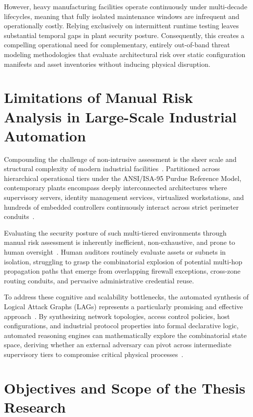 \documentclass[target=mst,aauheader=aics,style=]{thud}
\begin{document}
However, heavy manufacturing facilities operate continuously under multi-decade lifecycles, meaning that fully isolated maintenance windows are infrequent and operationally costly. Relying exclusively on intermittent runtime testing leaves substantial temporal gaps in plant security posture. Consequently, this creates a compelling operational need for complementary, entirely out-of-band threat modeling methodologies that evaluate architectural risk over static configuration manifests and asset inventories without inducing physical disruption.

\section{Limitations of Manual Risk Analysis in Large-Scale Industrial Automation}

Compounding the challenge of non-intrusive assessment is the sheer scale and structural complexity of modern industrial facilities~\cite{Sunder2024}. Partitioned across hierarchical operational tiers under the ANSI/ISA-95 Purdue Reference Model, contemporary plants encompass deeply interconnected architectures where supervisory servers, identity management services, virtualized workstations, and hundreds of embedded controllers continuously interact across strict perimeter conduits~\cite{Ou05, Stan2023}. 

Evaluating the security posture of such multi-tiered environments through manual risk assessment is inherently inefficient, non-exhaustive, and prone to human oversight~\cite{Konsta2024}. Human auditors routinely evaluate assets or subnets in isolation, struggling to grasp the combinatorial explosion of potential multi-hop propagation paths that emerge from overlapping firewall exceptions, cross-zone routing conduits, and pervasive administrative credential reuse.

To address these cognitive and scalability bottlenecks, the automated synthesis of Logical Attack Graphs (LAGs) represents a particularly promising and effective approach~\cite{Ou05, Tayouri2026}. By synthesizing network topologies, access control policies, host configurations, and industrial protocol properties into formal declarative logic, automated reasoning engines can mathematically explore the combinatorial state space, deriving whether an external adversary can pivot across intermediate supervisory tiers to compromise critical physical processes~\cite{Ou05, Sunder2024}.

\section{Objectives and Scope of the Thesis Research}
\label{sec:objectives}
\label{sec:objectives_scope}
\end{document}
